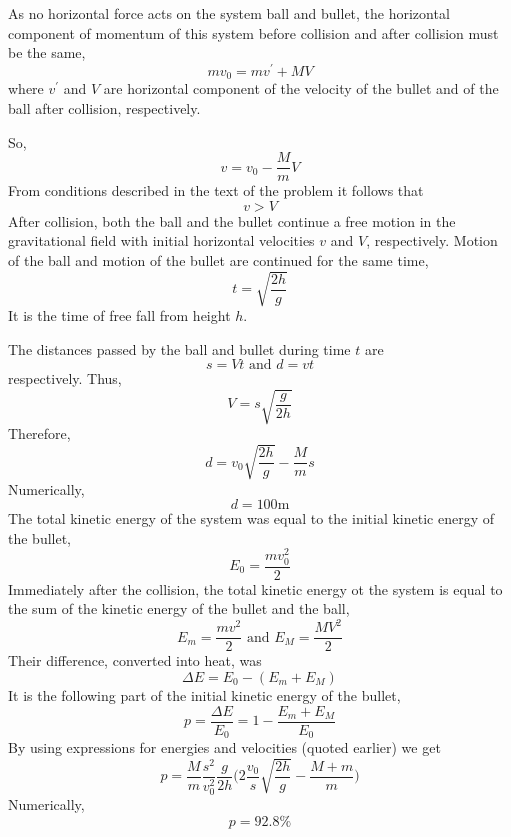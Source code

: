 \documentclass[12pt,a4paper]{book}
\begin{document}
	As no horizontal force acts on the system ball and bullet, the horizontal component of momentum of this system before collision and after collision must be the same,
	\begin{equation*}
		mv_0=mv^{'}+MV
	\end{equation*}
	where $v^{'}$ and $V$ are horizontal component of the velocity of the bullet and of the ball after collision, respectively.\par
	So,
	\begin{equation*}
		v=v_0-\frac{M}{m}V
	\end{equation*}
	From conditions described in the text of the problem it follows that
	\begin{equation*}
		v>V
	\end{equation*}
	After collision, both the ball and the bullet continue a free motion in the gravitational field with initial horizontal velocities $v$ and $V$, respectively. Motion of the ball and motion of the bullet are continued for the same time,
	\begin{equation*}
		t=\sqrt{\frac{2h}{g}}
	\end{equation*}
	It is the time of free fall from height $h$.\par
	The distances passed by the ball and bullet during time $t$ are
	\begin{equation*}
		s=Vt\text{ and }d=vt
	\end{equation*}
	respectively. Thus,
	\begin{equation*}
		V=s\sqrt{\frac{g}{2h}}
	\end{equation*}
	Therefore,
	\begin{equation}
		d=v_0\sqrt{\frac{2h}{g}}-\frac{M}{m}s
	\end{equation}
	Numerically,
	\begin{equation*}
		d=100\text{m}
	\end{equation*}
	The total kinetic energy of the system was equal to the initial kinetic energy of the bullet,
	\begin{equation*}
		E_0=\frac{mv_0^{2}}{2}
	\end{equation*}
	Immediately after the collision, the total kinetic energy ot the system is equal to the sum of the kinetic energy of the bullet and the ball,
	\begin{equation*}
		E_m=\frac{mv^{2}}{2}\text{ and }E_M=\frac{MV^{2}}{2}
	\end{equation*}
	Their difference, converted into heat, was
	\begin{equation*}
		\Delta E=E_0-(E_m+E_M)
	\end{equation*}
	It is the following part of the initial kinetic energy of the bullet,
	\begin{equation*}
		p=\frac{\Delta E}{E_0}=1-\frac{E_m+E_M}{E_0}
	\end{equation*}
	By using expressions for energies and velocities (quoted earlier) we get
	\begin{equation}
		p=\frac{M}{m}\frac{s^2}{v_0^2}\frac{g}{2h}\Big(2\frac{v_0}{s}\sqrt{\frac{2h}{g}}-\frac{M+m}{m}\Big)
	\end{equation}
	Numerically,
	\begin{equation*}
		p=92.8\text{\%}
	\end{equation*}
\end{document}
